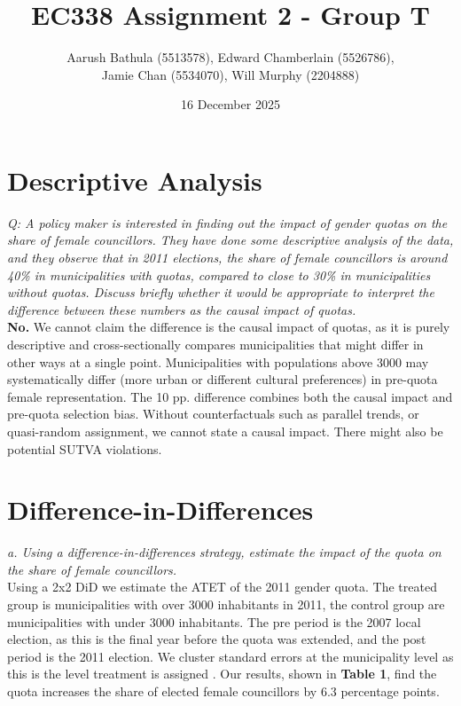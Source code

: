 \documentclass[12pt]{article}
\title{EC338 Assignment 2 - Group T}
\author{Aarush Bathula (5513578), Edward Chamberlain (5526786), \\
Jamie Chan (5534070), Will Murphy (2204888)}
\date{16 December 2025}
\begin{document}
\maketitle

\section{Descriptive Analysis}

\textit{Q: A policy maker is interested in finding out the impact of gender quotas on the share of female councillors. They have done some descriptive analysis of the data, and they observe that in 2011 elections, the share of female councillors is around 40\% in municipalities with quotas, compared to close to 30\% in municipalities without quotas.  Discuss briefly whether it would be appropriate to interpret the difference between these numbers as the causal impact of
quotas.} \\

\textbf{No.} We cannot claim the difference is the causal impact of quotas, as it is purely descriptive and cross-sectionally compares municipalities that might differ in other ways at a single point. Municipalities with populations above 3000 may systematically differ (more urban or different cultural preferences) in pre-quota female representation. The 10 pp. difference combines both the causal impact and pre-quota selection bias. Without counterfactuals such as parallel trends, or quasi-random assignment, we cannot state a causal impact. There might also be potential SUTVA violations.

\section{Difference-in-Differences}

\textit{a. Using a difference-in-differences strategy, estimate the impact of the quota on the share of female councillors.} \\

Using a 2x2 DiD  we estimate the ATET of the 2011 gender quota. The treated group is municipalities with over 3000 inhabitants in 2011, the control group are municipalities with under 3000 inhabitants. The pre period is the 2007 local election, as this is the final year before the quota was extended, and the post period is the 2011 election. We cluster standard errors at the municipality level as this is the level treatment is assigned . Our results, shown in \textbf{Table 1}, find the quota increases the share of elected female councillors by 6.3 percentage points.\\
\end{document}
